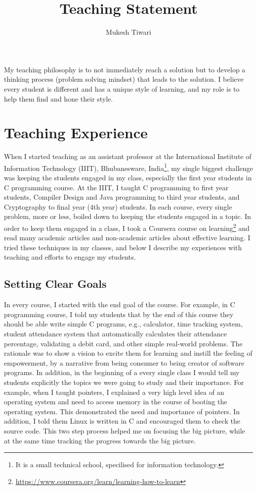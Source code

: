 \documentclass[a4paper]{article}
\title{Teaching Statement}
\author{Mukesh Tiwari}
\begin{document}
\fontsize{12}{15}
\selectfont
\maketitle


My teaching philosophy is to not immediately reach a solution but to develop a 
thinking process (problem solving mindset) that leads to the solution. I believe every 
student is different and has a unique style of learning, and my role is to help them find 
and hone their style.

\section{Teaching Experience}
When I started teaching as an assistant professor at the International Institute of Information 
Technology (IIIT), Bhubanesware, India\footnote{It is a small technical school, 
specilised for information technology.},
my single biggest challenge was keeping the students engaged in my class, especially the first year 
students in C programming course. At the IIIT, I taught C programming to 
first year students, Compiler Design and Java programming to third year students, and
Cryptography to final year (4th year) students. In each course, every single 
problem,  more or less, boiled down to keeping the students engaged in a topic. 
In order to keep them engaged in a class, I took a Coursera course on 
learning\footnote{\url{https://www.coursera.org/learn/learning-how-to-learn}} and 
read many academic articles and non-academic articles about effective learning.
I tried these techniques in my classes, and below I 
describe my experiences with teaching and efforts to engage my students. 





\subsection{Setting Clear Goals}
In every course, I started with the end goal of the course. For example, 
in C programming course, I told my students that by the end of this 
course they should be 
able write simple C programs, e.g., calculator, time tracking system,
student attendance system that automatically calculates their attendance percentage, 
validating a debit card, and other simple real-world problems. The rationale was 
to show a vision to excite them 
for learning and instill the feeling of empowerment, by a narrative from
being consumer to being creator of software programs.
In addition, in the beginning of a every single class 
I would tell my students explicitly the topics we were going to study and 
their importance. For example, when I taught pointers, I explained a 
very high level idea of an operating system and need to access memory 
in the course of booting the operating system. This demonstrated the 
need and importance of pointers. In addition, I told them
Linux is written in C and encouraged them to check the source code.
This two step process helped me on focusing the big picture, 
while at the same time tracking the progress towards the big picture.
\end{document}
